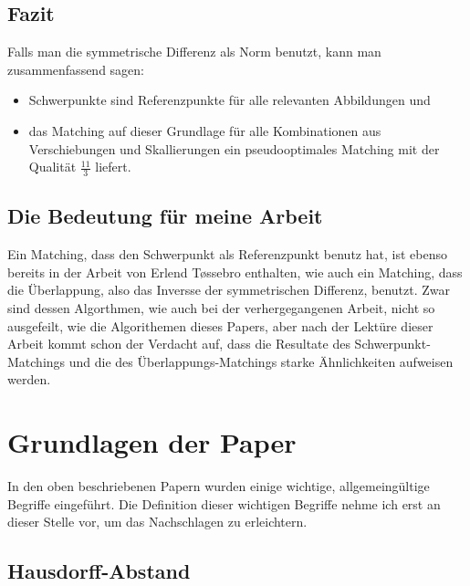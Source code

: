 \subsection{Fazit}

Falls man die symmetrische Differenz als Norm benutzt, kann man  zusammenfassend sagen:
\begin{itemize}
\item Schwerpunkte sind Referenzpunkte für alle relevanten Abbildungen und
\item das Matching auf dieser Grundlage für alle Kombinationen aus Verschiebungen und Skallierungen ein pseudooptimales Matching mit der Qualität $\frac{11}{3}$ liefert. 
\end{itemize} 
\subsection{Die Bedeutung für meine Arbeit}\label{BedeutungAFRW}

Ein Matching, dass den Schwerpunkt als Referenzpunkt benutz hat, ist ebenso bereits in der Arbeit von Erlend T\o{}ssebro enthalten, wie auch ein Matching, dass die Überlappung, also das Inversse der symmetrischen Differenz, benutzt. Zwar sind dessen Algorthmen, wie auch bei der verhergegangenen Arbeit, nicht so ausgefeilt, wie die Algorithemen dieses Papers, aber nach der Lektüre dieser Arbeit kommt schon der Verdacht auf, dass die Resultate des Schwerpunkt-Matchings und die des Überlappungs-Matchings starke Ähnlichkeiten aufweisen werden. 

\section{Grundlagen der Paper}
In den oben beschriebenen Papern wurden einige wichtige, allgemeingültige Begriffe eingeführt. Die Definition dieser wichtigen Begriffe nehme ich erst an dieser Stelle vor, um das Nachschlagen zu erleichtern.

\subsection{Hausdorff-Abstand}\label{Hausdorff} 


